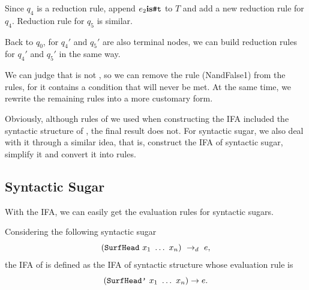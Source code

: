 
Since $q_4$ is a reduction rule, append $e_2 \mbox{\rm \bf is} \mbox{\tt \#t}$ to $T$ and add a new reduction rule for $q_4$. Reduction rule for $q_5$ is similar.



Back to $q_0$, for $q_4'$ and $q_5'$ are also terminal nodes, we can build reduction rules for $q_4'$ and $q_5'$ in the same way.



We can judge that  is not , so we can remove the rule (NandFalse1) from the rules, for it contains a condition that will never be met. At the same time, we rewrite the remaining rules into a more customary form.


Obviously, although rules of  we used when constructing the IFA included the syntactic structure of , the final result does not. For syntactic sugar, we also deal with it through a similar idea, that is, construct the IFA of syntactic sugar, simplify it and convert it into rules.

\subsection{Syntactic Sugar}

With the IFA, we can easily get the evaluation rules for syntactic sugars.

\begin{Def}

Considering the following syntactic sugar 
\[
(\mbox{\tt SurfHead}~x_1~\ldots~x_n) ~\rightarrow_d~ e,
\] 
the IFA of  is defined as the IFA of syntactic structure  whose evaluation rule is
\[
(\mbox{\tt SurfHead'}~x_1~\ldots~x_n)\rightarrow e.
\]

\end{Def}
